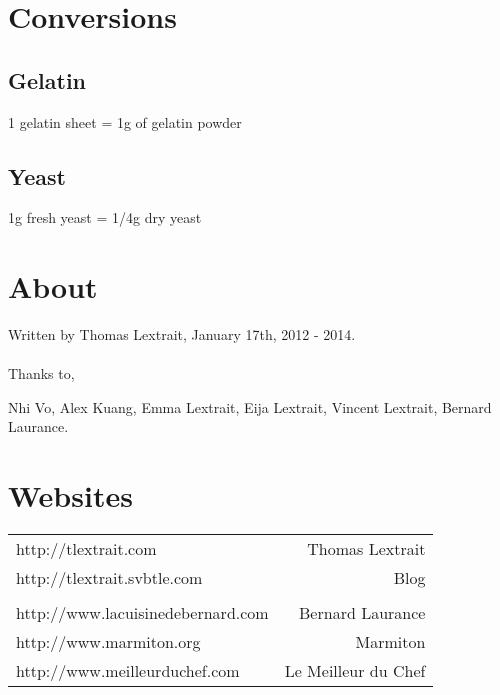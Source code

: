 \documentclass[10pt]{book}
\begin{document}
\newpage
\section*{Conversions}
\subsection*{Gelatin}
1 gelatin sheet = 1g of gelatin powder

\subsection*{Yeast}
1g fresh yeast = 1/4g dry yeast

\newpage
\section*{About}

Written by Thomas Lextrait, January 17th, 2012 - 2014.\\\\
Thanks to,

Nhi Vo, Alex Kuang, Emma Lextrait, Eija Lextrait, Vincent Lextrait, Bernard Laurance.

\newpage
\section*{Websites}

\begin{tabular}{ l r }
http://tlextrait.com & Thomas Lextrait \\
http://tlextrait.svbtle.com & Blog\\\\
http://www.lacuisinedebernard.com & Bernard Laurance \\
http://www.marmiton.org & Marmiton\\
http://www.meilleurduchef.com & Le Meilleur du Chef\\
\end{tabular}

\newpage
\end{document}
